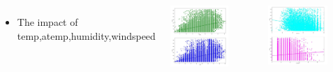 \documentclass{tikzposter} %
\begin{document}
\begin{columns}
{    \begin{itemize}                            
        \item
        The impact of temp,atemp,humidity,windspeed
    \end{itemize}
    \begin{minipage}{0.5\linewidth}
        \centering
        \includegraphics[width=0.7\textwidth]{pic1/three tahw1 (1).png} 
    \end{minipage}
    \begin{minipage}{0.4\linewidth}
        \centering
        \includegraphics[width=0.7\textwidth]{pic1/three tahw2.png} 
    \end{minipage}
   
}
\end{columns}
\end{document}
